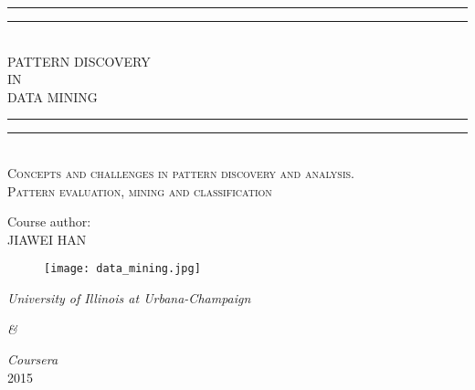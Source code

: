 \begin{titlepage}

\centering %
\vspace*{\baselineskip} %

\rule{\textwidth}{1.6pt}\vspace*{-\baselineskip}\vspace*{2pt} %
\rule{\textwidth}{0.4pt}\\[\baselineskip] %

{\LARGE PATTERN DISCOVERY \\ IN \\[0.3\baselineskip] DATA MINING}\\[0.2\baselineskip] %

\rule{\textwidth}{0.4pt}\vspace*{-\baselineskip}\vspace{3.2pt} %
\rule{\textwidth}{1.6pt}\\[\baselineskip] %

\scshape %
Concepts and challenges in pattern discovery and analysis. \\ 
Pattern evaluation, mining and classification \\[\baselineskip] %

\vspace*{2\baselineskip} %

Course author:\\[\baselineskip]
{\Large JIAWEI HAN}\\[\baselineskip]

\begin{figure}[H]
    \centering
    \texttt{[image: data\_mining.jpg]}
\end{figure}

\vfill

{\large \itshape University of Illinois at Urbana-Champaign\par}
{\large \itshape \&\par}
{\large \itshape Coursera}\\[\baselineskip]
{\Large 2015}

\end{titlepage}

\thispagestyle{empty}
\tableofcontents
\newpage